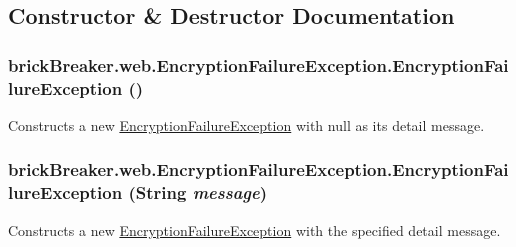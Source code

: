 \subsection{Constructor \& Destructor Documentation}
\hypertarget{classbrick_breaker_1_1web_1_1_encryption_failure_exception_a9e4ffedf49a319ffa068ccc930cfd6cb}{
\subsubsection[{EncryptionFailureException}]{\setlength{\rightskip}{0pt plus 5cm}brickBreaker.web.EncryptionFailureException.EncryptionFailureException ()}}
\label{classbrick_breaker_1_1web_1_1_encryption_failure_exception_a9e4ffedf49a319ffa068ccc930cfd6cb}
Constructs a new {\ttfamily \hyperlink{classbrick_breaker_1_1web_1_1_encryption_failure_exception}{EncryptionFailureException}} with {\ttfamily null} as its detail message. \hypertarget{classbrick_breaker_1_1web_1_1_encryption_failure_exception_aab8090ce69ecf671c7f99d75827e24b6}{
\subsubsection[{EncryptionFailureException}]{\setlength{\rightskip}{0pt plus 5cm}brickBreaker.web.EncryptionFailureException.EncryptionFailureException (String {\em message})}}
\label{classbrick_breaker_1_1web_1_1_encryption_failure_exception_aab8090ce69ecf671c7f99d75827e24b6}
Constructs a new {\ttfamily \hyperlink{classbrick_breaker_1_1web_1_1_encryption_failure_exception}{EncryptionFailureException}} with the specified detail message.


